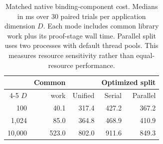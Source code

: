 \begin{table}[t]
\centering
\caption{Matched native binding-component cost. Medians in ms over 30 paired trials per
application dimension \(D\). Each mode includes common library work plus its
proof-stage wall time. Parallel split uses two processes with default thread
pools. This measures resource sensitivity rather than equal-resource performance.}
\label{tab:native-moment-cost}
\footnotesize
\setlength{\tabcolsep}{3.2pt}
\begin{tabular}{@{}rrrrr@{}}
\toprule
& Common & & \multicolumn{2}{c}{Optimized split} \\
\cmidrule(l){4-5}
\(D\) & work & Unified & Serial & Parallel \\
\midrule
100 & 40.1 & 317.4 & 427.2 & 367.2 \\
1,024 & 85.0 & 364.8 & 468.9 & 410.9 \\
10,000 & 523.0 & 802.0 & 911.6 & 849.3 \\
\bottomrule
\end{tabular}
\end{table}
